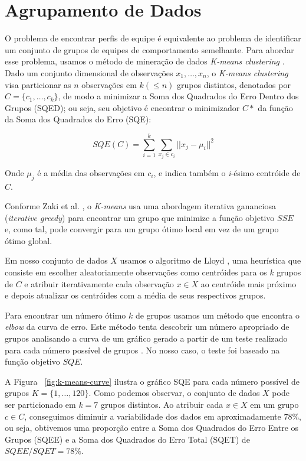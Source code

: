 \chapter{Agrupamento de Dados}
O problema de encontrar perfis de equipe é equivalente ao problema de identificar um conjunto de grupos de equipes de comportamento semelhante. Para abordar esse problema, usamos o método de mineração de dados \textit{K-means clustering} \cite{zaki2014data}. Dado um conjunto dimensional de observações \(x_1, \ldots, x_n \), o \textit{K-means clustering} visa particionar as $n$ observações em $k (\leq n)$ grupos distintos, denotados por $ C = \{c_1, \ldots , c_k \} $, de modo a minimizar a Soma dos Quadrados do Erro Dentro dos Grupos (SQED); ou seja, seu objetivo é encontrar o minimizador $C*$ da função da Soma dos Quadrados do Erro (SQE):

\begin{displaymath}
  SQE(C) = \sum_{i=1}^{k} \sum_{x_j \in c_i}{} || x_j - \mu _i ||^2
\end{displaymath}

Onde $\mu_j$ é a média das observações em $c_i$, e indica também o \textit{i}-ésimo centróide de $C$.

Conforme Zaki et al. \cite{zaki2014data}, o \textit{K-means} usa uma abordagem iterativa gananciosa (\textit{iterative greedy}) para encontrar um grupo que minimize a função objetivo $SSE$ e, como tal, pode convergir para um grupo ótimo local em vez de um grupo ótimo global.

Em nosso conjunto de dados $X$ usamos o algoritmo de Lloyd \cite{ong2015player}, uma heurística que consiste em escolher aleatoriamente observações como centróides para os $k$ grupos de $C$ e atribuir iterativamente cada observação $x \in X$ ao centróide mais próximo e depois atualizar os centróides com a média de seus respectivos grupos.

Para encontrar um número ótimo $k$ de grupos usamos um método que encontra o \textit{elbow} da curva de erro. Este método tenta descobrir um número apropriado de grupos analisando a curva de um gráfico gerado a partir de um teste realizado para cada número possível de grupos \cite{kodinariya2013review}. No nosso caso, o teste foi baseado na função objetivo $SQE$.

A Figura ~\ref{fig:k-means-curve} ilustra o gráfico SQE para cada número possível de grupos $K = \{1, \ldots, 120\}$. Como podemos observar, o conjunto de dados $X$ pode ser particionado em $k=7$ grupos distintos. Ao atribuir cada $x \in X$ em um grupo $c \in C$, conseguimos diminuir a variabilidade dos dados em aproximadamente $78\%$, ou seja, obtivemos uma proporção entre a Soma dos Quadrados do Erro Entre os Grupos (SQEE) e a Soma dos Quadrados do Erro Total (SQET) de $SQEE/SQET = 78 \%$.

